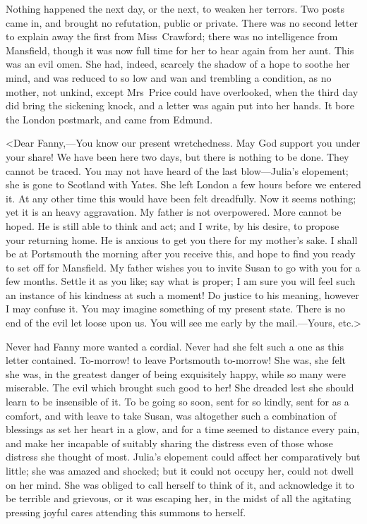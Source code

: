 Nothing happened the next day, or the next, to weaken her terrors. Two posts came in, and brought no refutation, public or private. There was no second letter to explain away the first from Miss~Crawford; there was no intelligence from Mansfield, though it was now full time for her to hear again from her aunt. This was an evil omen. She had, indeed, scarcely the shadow of a hope to soothe her mind, and was reduced to so low and wan and trembling a condition, as no mother, not unkind, except Mrs~Price could have overlooked, when the third day did bring the sickening knock, and a letter was again put into her hands. It bore the London postmark, and came from Edmund.

<Dear Fanny,—You know our present wretchedness. May God support you under your share! We have been here two days, but there is nothing to be done. They cannot be traced. You may not have heard of the last blow—Julia's elopement; she is gone to Scotland with Yates. She left London a few hours before we entered it. At any other time this would have been felt dreadfully. Now it seems nothing; yet it is an heavy aggravation. My father is not overpowered. More cannot be hoped. He is still able to think and act; and I write, by his desire, to propose your returning home. He is anxious to get you there for my mother's sake. I shall be at Portsmouth the morning after you receive this, and hope to find you ready to set off for Mansfield. My father wishes you to invite Susan to go with you for a few months. Settle it as you like; say what is proper; I am sure you will feel such an instance of his kindness at such a moment! Do justice to his meaning, however I may confuse it. You may imagine something of my present state. There is no end of the evil let loose upon us. You will see me early by the mail.—Yours, etc.>

Never had Fanny more wanted a cordial. Never had she felt such a one as this letter contained. To-morrow! to leave Portsmouth to-morrow! She was, she felt she was, in the greatest danger of being exquisitely happy, while so many were miserable. The evil which brought such good to her! She dreaded lest she should learn to be insensible of it. To be going so soon, sent for so kindly, sent for as a comfort, and with leave to take Susan, was altogether such a combination of blessings as set her heart in a glow, and for a time seemed to distance every pain, and make her incapable of suitably sharing the distress even of those whose distress she thought of most. Julia's elopement could affect her comparatively but little; she was amazed and shocked; but it could not occupy her, could not dwell on her mind. She was obliged to call herself to think of it, and acknowledge it to be terrible and grievous, or it was escaping her, in the midst of all the agitating pressing joyful cares attending this summons to herself.

